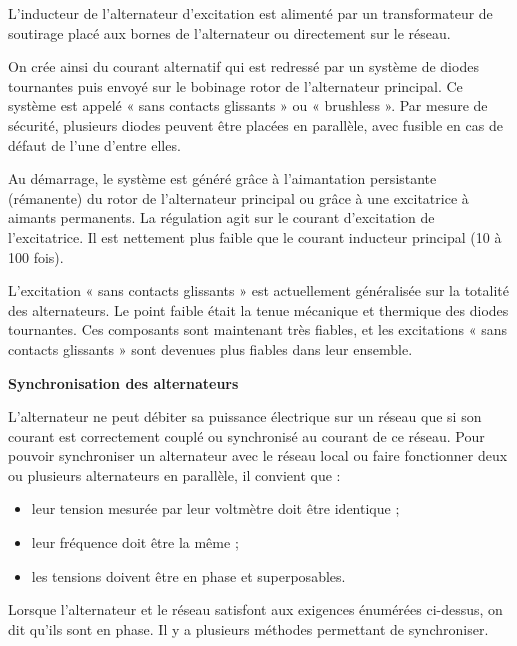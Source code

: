 L’inducteur de l’alternateur d’excitation est alimenté par un transformateur de soutirage placé aux bornes de l’alternateur ou directement sur le réseau.
\vspace{0.3cm}

On crée ainsi du courant alternatif qui est redressé par un système de diodes tournantes puis envoyé sur le bobinage rotor de l’alternateur principal. Ce système est appelé « sans contacts glissants » ou « brushless ». Par mesure de sécurité, plusieurs diodes peuvent être placées en parallèle, avec fusible en cas de défaut de l’une d’entre elles.
\vspace{0.3cm}

Au démarrage, le système est généré grâce à l’aimantation persistante (rémanente) du rotor de l’alternateur principal ou grâce à une excitatrice à aimants permanents. La régulation agit sur le courant d’excitation de l’excitatrice. Il est nettement plus faible que le courant inducteur principal (10 à 100 fois).
\vspace{0.3cm}

L’excitation « sans contacts glissants » est actuellement généralisée sur la totalité des alternateurs. Le point faible était la tenue mécanique et thermique des diodes tournantes. Ces composants sont maintenant très fiables, et les excitations « sans contacts glissants » sont devenues plus fiables dans leur ensemble.


\vspace{0.3cm}

\textbf{Synchronisation des alternateurs}
\vspace{0.3cm} 

L’alternateur ne peut débiter sa puissance électrique sur un réseau que si son courant est correctement couplé ou synchronisé au courant de ce réseau. Pour pouvoir synchroniser un alternateur avec le réseau local ou faire fonctionner deux ou plusieurs alternateurs en parallèle, il convient que :

\begin{itemize}
\item leur tension mesurée par leur voltmètre doit être identique ;
\item leur fréquence doit être la même ;
\item les tensions doivent être en phase et superposables.

\end{itemize}

Lorsque l’alternateur et le réseau satisfont aux exigences énumérées ci-dessus, on dit qu’ils sont en phase.
Il y a plusieurs méthodes permettant de synchroniser.

